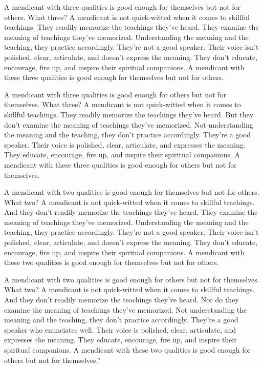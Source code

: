 \documentclass[12pt,openany]{book}%
\begin{document}
A mendicant with three qualities is good enough for themselves but not for others. What three? A mendicant is not quick-witted when it comes to skillful teachings. They readily memorize the teachings they’ve heard. They examine the meaning of teachings they’ve memorized. Understanding the meaning and the teaching, they practice accordingly. They’re not a good speaker. Their voice isn’t polished, clear, articulate, and doesn’t express the meaning. They don’t educate, encourage, fire up, and inspire their spiritual companions. A mendicant with these three qualities is good enough for themselves but not for others. 

A mendicant with three qualities is good enough for others but not for themselves. What three? A mendicant is not quick-witted when it comes to skillful teachings. They readily memorize the teachings they’ve heard. But they don’t examine the meaning of teachings they’ve memorized. Not understanding the meaning and the teaching, they don’t practice accordingly. They’re a good speaker. Their voice is polished, clear, articulate, and expresses the meaning. They educate, encourage, fire up, and inspire their spiritual companions. A mendicant with these three qualities is good enough for others but not for themselves. 

A mendicant with two qualities is good enough for themselves but not for others. What two? A mendicant is not quick-witted when it comes to skillful teachings. And they don’t readily memorize the teachings they’ve heard. They examine the meaning of teachings they’ve memorized. Understanding the meaning and the teaching, they practice accordingly. They’re not a good speaker. Their voice isn’t polished, clear, articulate, and doesn’t express the meaning. They don’t educate, encourage, fire up, and inspire their spiritual companions. A mendicant with these two qualities is good enough for themselves but not for others. 

A mendicant with two qualities is good enough for others but not for themselves. What two? A mendicant is not quick-witted when it comes to skillful teachings. And they don’t readily memorize the teachings they’ve heard. Nor do they examine the meaning of teachings they’ve memorized. Not understanding the meaning and the teaching, they don’t practice accordingly. They’re a good speaker who enunciates well. Their voice is polished, clear, articulate, and expresses the meaning. They educate, encourage, fire up, and inspire their spiritual companions. A mendicant with these two qualities is good enough for others but not for themselves.” 
\end{document}
